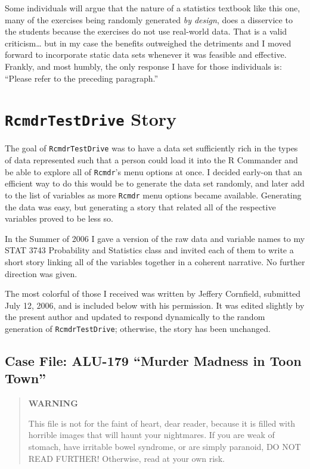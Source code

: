 \documentclass[captions=tableheading]{scrbook}
\begin{document}
Some individuals will argue that the nature of a statistics textbook like this one, many of the exercises being randomly generated \emph{by design}, does a disservice to the students because the exercises do not use real-world data. That is a valid criticism\ldots{} but in my case the benefits outweighed the detriments and I moved forward to incorporate static data sets whenever it was feasible and effective. Frankly, and most humbly, the only response I have for those individuals is: ``Please refer to the preceding paragraph.''
\chapter{\texttt{RcmdrTestDrive} Story}
\label{sec-24}

\label{cha:RcmdrTestDrive-Story}

The goal of \texttt{RcmdrTestDrive} was to have a data set sufficiently rich in the types of data represented such that a person could load it into the \textsf{R} Commander and be able to explore all of \texttt{Rcmdr}'s menu options at once. I decided early-on that an efficient way to do this would be to generate the data set randomly, and later add to the list of variables as more \texttt{Rcmdr} menu options became available. Generating the data was easy, but generating a story that related all of the respective variables proved to be less so.

In the Summer of 2006 I gave a version of the raw data and variable names to my STAT 3743 Probability and Statistics class and invited each of them to write a short story linking all of the variables together in a coherent narrative. No further direction was given. 

The most colorful of those I received was written by Jeffery Cornfield, submitted July 12, 2006, and is included below with his permission. It was edited slightly by the present author and updated to respond dynamically to the random generation of \texttt{RcmdrTestDrive}; otherwise, the story has been unchanged. 
\section{Case File: ALU-179 ``Murder Madness in Toon Town”}
\label{sec-24-1}

\begin{quote}
\noindent \begin{center}
\textbf{WARNING} 
\par\end{center}
\noindent This file is not for the faint of heart, dear reader, because it is filled with horrible images that will haunt your nightmares. If you are weak of stomach, have irritable bowel syndrome, or are simply paranoid, DO NOT READ FURTHER! Otherwise, read at your own risk.
\end{quote}
\end{document}
